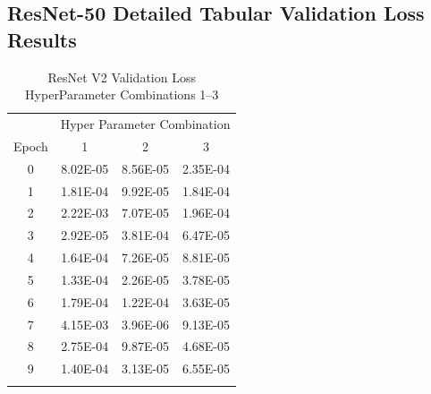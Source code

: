 \documentclass[10pt, conference]{IEEEtran}
\begin{document}


\subsection{ResNet-50 Detailed Tabular Validation Loss Results} %

\begin{table}[H]
    \centering
    \begin{tabular}{@{}cccc@{}}
        \toprule
        & \multicolumn{3}{c}{Hyper Parameter Combination} \\
        \cmidrule{2-4}
            Epoch  & 1 & 2 & 3\\
        \midrule

        0 & 8.02E-05 & 8.56E-05 & 2.35E-04 \\
        1 & 1.81E-04 & 9.92E-05 & 1.84E-04 \\
        2 & 2.22E-03 & 7.07E-05 & 1.96E-04 \\
        3 & 2.92E-05 & 3.81E-04 & 6.47E-05 \\
        4 & 1.64E-04 & 7.26E-05 & 8.81E-05 \\
        5 & 1.33E-04 & 2.26E-05 & 3.78E-05 \\
        6 & 1.79E-04 & 1.22E-04 & 3.63E-05 \\
        7 & 4.15E-03 & 3.96E-06 & 9.13E-05 \\
        8 & 2.75E-04 & 9.87E-05 & 4.68E-05 \\
        9 & 1.40E-04 & 3.13E-05 & 6.55E-05 \\

        \bottomrule\smallskip
    \end{tabular}
    \caption{ResNet V2 Validation Loss HyperParameter Combinations 1--3}%
    \label{table:ResNetValidationLoss1-3}
\end{table}
\end{document}
